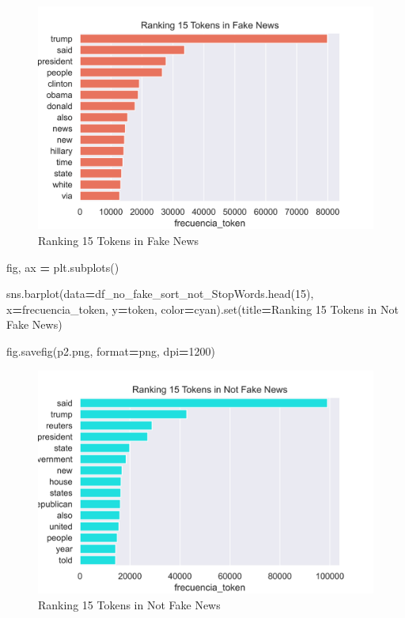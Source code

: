 \documentclass[
  11pt,
  a4paper,
]{article}
\newenvironment{Shaded}{\begin{snugshade}}{\end{snugshade}}
\newcommand{\BuiltInTok}[1]{#1}
\newcommand{\DecValTok}[1]{\textcolor[rgb]{0.00,0.00,0.81}{#1}}
\newcommand{\NormalTok}[1]{#1}
\newcommand{\OperatorTok}[1]{\textcolor[rgb]{0.81,0.36,0.00}{\textbf{#1}}}
\newcommand{\StringTok}[1]{\textcolor[rgb]{0.31,0.60,0.02}{#1}}
\begin{document}
\begin{figure}
\centering
\includegraphics{p1.png}
\caption{Ranking 15 Tokens in Fake News}
\end{figure}

\begin{Shaded}
\begin{Highlighting}[]
\NormalTok{fig, ax }\OperatorTok{=}\NormalTok{ plt.subplots()}

\NormalTok{sns.barplot(data}\OperatorTok{=}\NormalTok{df\_no\_fake\_sort\_not\_StopWords.head(}\DecValTok{15}\NormalTok{), x}\OperatorTok{=}\StringTok{\textquotesingle{}frecuencia\_token\textquotesingle{}}\NormalTok{, y}\OperatorTok{=}\StringTok{\textquotesingle{}token\textquotesingle{}}\NormalTok{, color}\OperatorTok{=}\StringTok{\textquotesingle{}cyan\textquotesingle{}}\NormalTok{).}\BuiltInTok{set}\NormalTok{(title}\OperatorTok{=}\StringTok{\textquotesingle{}Ranking 15 Tokens in Not Fake News\textquotesingle{}}\NormalTok{) }

\NormalTok{fig.savefig(}\StringTok{\textquotesingle{}p2.png\textquotesingle{}}\NormalTok{, }\BuiltInTok{format}\OperatorTok{=}\StringTok{\textquotesingle{}png\textquotesingle{}}\NormalTok{, dpi}\OperatorTok{=}\DecValTok{1200}\NormalTok{)}
\end{Highlighting}
\end{Shaded}

\begin{figure}
\centering
\includegraphics{p2.png}
\caption{Ranking 15 Tokens in Not Fake News}
\end{figure}
\end{document}
